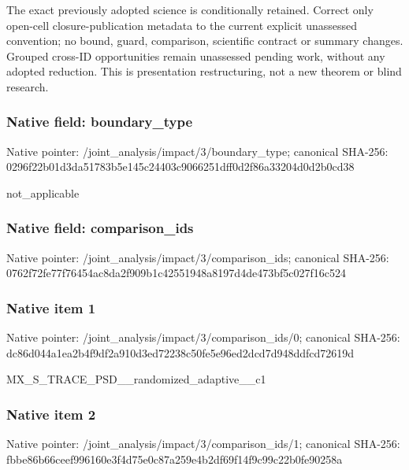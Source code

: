 \documentclass[10pt,a4paper]{article}
\begin{document}
\begingroup\raggedright\sloppy The exact previously adopted science is conditionally retained. Correct only open-cell closure-publication metadata to the current explicit unassessed convention;\allowbreak{} no bound,\allowbreak{} guard,\allowbreak{} comparison,\allowbreak{} scientific contract or summary changes. Grouped cross-ID opportunities remain unassessed pending work,\allowbreak{} without any adopted reduction. This is presentation restructuring,\allowbreak{} not a new theorem or blind research.\par\endgroup

\subsubsection{Native field: boundary\_\allowbreak{}type}
Native pointer: /joint\_\allowbreak{}analysis/impact/3/boundary\_\allowbreak{}type; canonical SHA-256: 0296f22b01d3da51783b5e145c24403c9066251dff0d2f86a33204d0d2b0cd38

\begingroup\raggedright\sloppy not\_\allowbreak{}applicable\par\endgroup

\subsubsection{Native field: comparison\_\allowbreak{}ids}
Native pointer: /joint\_\allowbreak{}analysis/impact/3/comparison\_\allowbreak{}ids; canonical SHA-256: 0762f72fe77f76454ac8da2f909b1c42551948a8197d4de473bf5c027f16c524

\subsubsection{Native item 1}
Native pointer: /joint\_\allowbreak{}analysis/impact/3/comparison\_\allowbreak{}ids/0; canonical SHA-256: dc86d044a1ea2b4f9df2a910d3ed72238c50fe5e96ed2dcd7d948ddfcd72619d

\begingroup\raggedright\sloppy MX\_\allowbreak{}S\_\allowbreak{}TRACE\_\allowbreak{}PSD\_\allowbreak{}\_\allowbreak{}randomized\_\allowbreak{}adaptive\_\allowbreak{}\_\allowbreak{}c1\par\endgroup

\subsubsection{Native item 2}
Native pointer: /joint\_\allowbreak{}analysis/impact/3/comparison\_\allowbreak{}ids/1; canonical SHA-256: fbbe86b66ceef996160e3f4d75e0c87a259e4b2df69f14f9c99c22b0fe90258a
\end{document}
